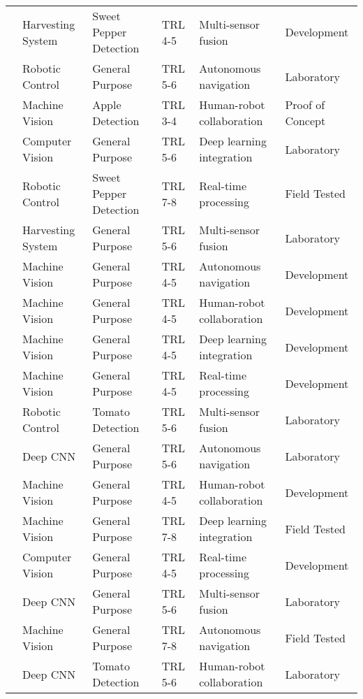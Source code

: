 \begin{table*}[htbp]
\begin{tabular}{@{}p{}p{}p{}p{}p{}p{}@{}}
\cite{harvest2020} & Harvesting System & Sweet Pepper Detection & TRL 4-5 & Multi-sensor fusion & Development \\
\cite{robot2020} & Robotic Control & General Purpose & TRL 5-6 & Autonomous navigation & Laboratory \\
\cite{apple2022} & Machine Vision & Apple Detection & TRL 3-4 & Human-robot collaboration & Proof of Concept \\
\cite{robot2022} & Computer Vision & General Purpose & TRL 5-6 & Deep learning integration & Laboratory \\
\cite{robot2017} & Robotic Control & Sweet Pepper Detection & TRL 7-8 & Real-time processing & Field Tested \\
\cite{harvest2018} & Harvesting System & General Purpose & TRL 5-6 & Multi-sensor fusion & Laboratory \\
\cite{harvest2019} & Machine Vision & General Purpose & TRL 4-5 & Autonomous navigation & Development \\
\cite{harvest2020} & Machine Vision & General Purpose & TRL 4-5 & Human-robot collaboration & Development \\
\cite{harvest2021} & Machine Vision & General Purpose & TRL 4-5 & Deep learning integration & Development \\
\cite{harvest2022} & Machine Vision & General Purpose & TRL 4-5 & Real-time processing & Development \\
\cite{robot2017} & Robotic Control & Tomato Detection & TRL 5-6 & Multi-sensor fusion & Laboratory \\
\cite{robot2018} & Deep CNN & General Purpose & TRL 5-6 & Autonomous navigation & Laboratory \\
\cite{harvest2018} & Machine Vision & General Purpose & TRL 4-5 & Human-robot collaboration & Development \\
\cite{harvest2019} & Machine Vision & General Purpose & TRL 7-8 & Deep learning integration & Field Tested \\
\cite{vision2021} & Computer Vision & General Purpose & TRL 4-5 & Real-time processing & Development \\
\cite{harvest2021} & Deep CNN & General Purpose & TRL 5-6 & Multi-sensor fusion & Laboratory \\
\cite{harvest2022} & Machine Vision & General Purpose & TRL 7-8 & Autonomous navigation & Field Tested \\
\cite{robot2018} & Deep CNN & Tomato Detection & TRL 5-6 & Human-robot collaboration & Laboratory \\
\bottomrule
\end{tabular}
\end{table*}
